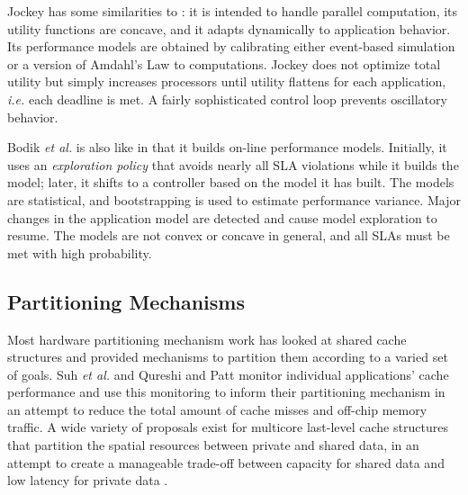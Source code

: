 %
Jockey\cite{Jockey} has some similarities to \pacora: it is intended to handle parallel computation, its utility functions are concave,
and it adapts dynamically to application behavior.
Its performance models are obtained by calibrating either event-based simulation or a version of Amdahl's Law to computations.
Jockey does not optimize total utility but simply increases processors until utility flattens for each application,
\emph{i.e.} each deadline is met.
A fairly sophisticated control loop prevents oscillatory behavior.

%
Bodik \emph{et al.}\cite{bodik-acdc09} is also like \pacora in that it builds on-line performance models.
Initially, it uses an \emph{exploration policy} that avoids nearly all SLA violations while it builds the model;
later, it shifts to a controller based on the model it has built.
The models are statistical, and bootstrapping is used to estimate performance variance.
Major changes in the application model are detected and cause model exploration to resume.
The models are not convex or concave in general, and all SLAs must be met with high probability.

\subsection*{Partitioning Mechanisms}
\label{sec:rel:pm}

%
Most hardware partitioning mechanism work has looked at shared cache structures and provided mechanisms to partition them according to a varied set of goals.  Suh \emph{et al.}\cite{876484, 967444} and Qureshi and Patt \cite{1194855} monitor individual applications' cache performance and use this monitoring to inform their partitioning mechanism in an attempt to reduce the total amount of cache misses and off-chip memory traffic. A wide variety of proposals exist for multicore last-level cache structures that partition the spatial resources between private and shared data, in an attempt to create a manageable trade-off between capacity for shared data and low latency for private data \cite{1275005,1194858,1318096,1088154,1399973,1069998,1399982}.

